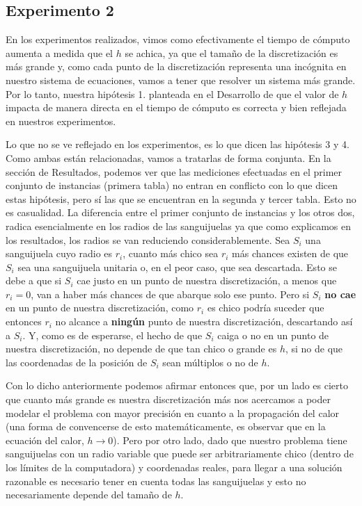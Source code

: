 \subsection{Experimento 2}
\par En los experimentos realizados, vimos como efectivamente el tiempo de cómputo aumenta a medida que el $h$ se achica, ya que el tamaño de la discretización es más grande y, como cada punto de la discretización representa una incógnita en nuestro sistema de ecuaciones, vamos a tener que resolver un sistema más grande. Por lo tanto, nuestra hipótesis 1. planteada en el Desarrollo de que el valor de $h$ impacta de manera directa en el tiempo de cómputo es correcta y bien reflejada en nuestros experimentos.
\par Lo que no se ve reflejado en los experimentos, es lo que dicen las hipótesis 3 y 4. Como ambas están relacionadas, vamos a tratarlas de forma conjunta. En la sección de Resultados, podemos ver que las mediciones efectuadas en el primer conjunto de instancias (primera tabla) no entran en conflicto con lo que dicen estas hipótesis, pero sí las que se encuentran en la segunda y tercer tabla. Esto no es casualidad. La diferencia entre el primer conjunto de instancias y los otros dos, radica esencialmente en los radios de las sanguijuelas ya que como explicamos en los resultados, los radios se van reduciendo considerablemente. Sea  $S_i$ una sanguijuela cuyo radio es $r_i$, cuanto más chico sea $r_i$ más chances existen de que $S_i$ sea una sanguijuela unitaria o, en el peor caso, que sea descartada. Esto se debe a que si $S_i$ cae justo en un punto de nuestra discretización, a menos que $r_i = 0$, van a haber más chances de que abarque solo ese punto. Pero si $S_i$ \textbf{no cae} en un punto de nuestra discretización, como $r_i$ es chico podría suceder que entonces $r_i$ no alcance a \textbf{ningún} punto de nuestra discretización, descartando así a $S_i$. Y, como es de esperarse, el hecho de que $S_i$ caiga o no en un punto de nuestra discretización, no depende de que tan chico o grande es $h$, si no de que las coordenadas de la posición de $S_i$ sean múltiplos o no de $h$.
\par Con lo dicho anteriormente podemos afirmar entonces que, por un lado es cierto que cuanto más grande es nuestra discretización más nos acercamos a poder modelar el problema con mayor precisión en cuanto a la propagación del calor (una forma de convencerse de esto matemáticamente, es observar que en la ecuación del calor, $h\to 0$). Pero por otro lado, dado que nuestro problema tiene sanguijuelas con un radio variable que puede ser arbitrariamente chico (dentro de los límites de la computadora) y coordenadas reales, para llegar a una solución razonable es necesario tener en cuenta todas las sanguijuelas y esto no necesariamente depende del tamaño de $h$.
